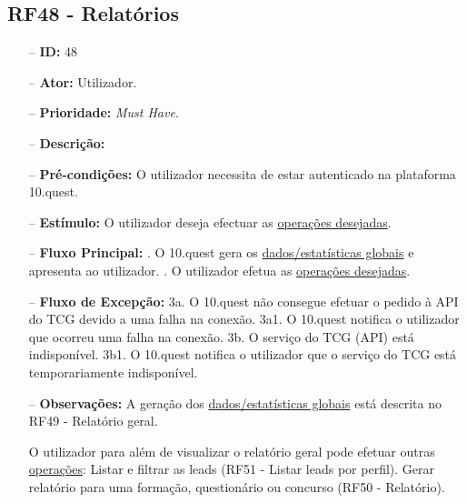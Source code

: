 \subsection{RF48 - Relatórios}
\begin{itemize}
	\item[--] \textbf{ID:} 48
	\item[--]  \textbf{Ator:} Utilizador.
	\item[--]  \textbf{Prioridade:} \textit{Must Have}.
	\item[--]  \textbf{Descrição:} 
	\item[--]  \textbf{Pré-condições:} O utilizador necessita de estar autenticado na plataforma 10.quest.
	\item[--]  \textbf{Estímulo:} O utilizador deseja efectuar as \underline{operações desejadas}.
	\item[--]  \textbf{Fluxo Principal:} 
		. O 10.quest gera os \underline{dados/estatísticas globais} e apresenta ao utilizador.
		. O utilizador efetua as \underline{operações desejadas}.
	\item[--]  \textbf{Fluxo de Excepção:} 
		\subitem 3a. O 10.quest não consegue efetuar o pedido à API do TCG devido a uma falha na conexão.
		\subitem 3a1. O 10.quest notifica o utilizador que ocorreu uma falha na conexão.
		\subitem 3b. O serviço do TCG (API) está indisponível.
		\subitem 3b1. O 10.quest notifica o utilizador que o serviço do TCG está temporariamente indisponível. 
	\item[--]  \textbf{Observações:} A geração dos \underline{dados/estatísticas globais} está descrita no RF49 - Relatório geral.
	
	O utilizador para além de visualizar o relatório geral pode efetuar outras \underline{operações}:
		\subitem Listar e filtrar as leads (RF51 - Listar leads por perfil).
		\subitem Gerar relatório para uma formação, questionário ou concurso (RF50 - Relatório).
	
\end{itemize}
\newpage

